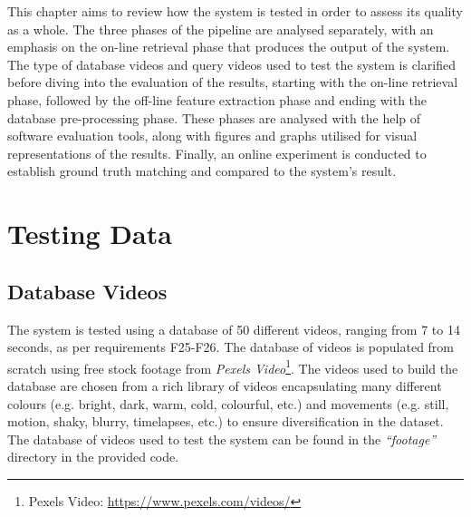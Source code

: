 This chapter aims to review how the system is tested in order to assess its quality as a whole. The three phases of the pipeline are analysed separately, with an emphasis on the on-line retrieval phase that produces the output of the system. The type of database videos and query videos used to test the system is clarified before diving into the evaluation of the results, starting with the on-line retrieval phase, followed by the off-line feature extraction phase and ending with the database pre-processing phase. These phases are analysed with the help of software evaluation tools, along with figures and graphs utilised for visual representations of the results. Finally, an online experiment is conducted to establish ground truth matching and compared to the system's result.


\section{Testing Data}

\subsection{Database Videos}

The system is tested using a database of 50 different videos, ranging from 7 to 14 seconds, as per requirements F25-F26. The database of videos is populated from scratch using free stock footage from \textit{Pexels Video}\footnote{Pexels Video: \url{https://www.pexels.com/videos/}}. The videos used to build the database are chosen from a rich library of videos encapsulating many different colours (e.g. bright, dark, warm, cold, colourful, etc.) and movements (e.g. still, motion, shaky, blurry, timelapses, etc.) to ensure diversification in the dataset. The database of videos used to test the system can be found in the \textit{``footage''} directory in the provided code.\\

